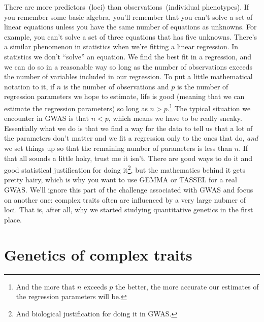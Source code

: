 \documentclass[12pt]{article}
\begin{document}
There are more predictors~(loci) than observations~(individual
phenotypes). If you remember some basic algebra, you'll remember that
you can't solve a set of linear equations unless you have the same
number of equations as unknowns. For example, you can't solve a set of
three equations that has five unknowns. There's a similar phenomenon
in statistics when we're fitting a linear regression. In statistics we
don't ``solve'' an equation. We find the best fit in a regression, and
we can do so in a reasonable way so long as the number of observations
exceeds the number of variables included in our regression. To put a
little mathematical notation to it, if $n$ is the number of
observations and $p$ is the number of regression parameters we hope to
estimate, life is good (meaning that we can estimate the regression
parameters) so long as $n > p$.\footnote{And the more that $n$ exceeds
  $p$ the better, the more accurate our estimates of the regression
  parameters will be.} The typical situation we encounter in GWAS is
that $n < p$, which means we have to be really sneaky. Essentially
what we do is that we find a way for the data to tell us that a lot of
the parameters don't matter and we fit a regression only to the ones
that do, {\it and\/} we set things up so that the remaining number of
parameters is less than $n$. If that all sounds a little hoky, trust
me it isn't. There are good ways to do it and good statistical
justification for doing it\footnote{And biological justification for
  doing it in GWAS.}, but the mathematics behind it gets pretty hairy,
which is why you want to use GEMMA or TASSEL for a real GWAS. We'll
ignore this part of the challenge associated with GWAS and focus on
another one: complex traits often are influenced by a very large
nubmer of loci. That is, after all, why we started studying
quantitative genetics in the first place.

\section*{Genetics of complex traits}
\end{document}
